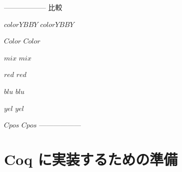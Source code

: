 \def\colorYBBY{\textit{colorYBBY}}
\def\Color{\textit{Color}}
\def\mix{\textit{mix}}
\def\red{\textit{red}}
\def\blu{\textit{blu}}
\def\yel{\textit{yel}}
\def\Cpos{\textit{Cpos}}

------------------
比較

$colorYBBY$ $\colorYBBY$

$Color$ $\Color$

$mix$ $\mix$

$red$ $\red$

$blu$ $\blu$

$yel$ $\yel$

$Cpos$ $\Cpos$
------------------

\section{ Coq に実装するための準備}
